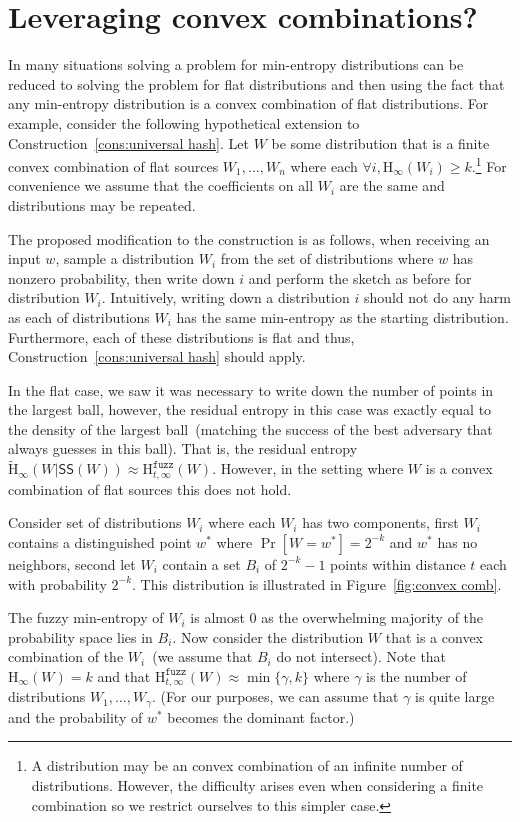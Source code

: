 \documentclass[11pt]{article}
\newcommand{\consref}[1]{\mbox{Construction~\ref{#1}}}
\newcommand{\figref}[1]{\mbox{Figure~\ref{#1}}}
\newcommand{\class}[1]{{\ensuremath{\mathsf{#1}}}}
\newcommand{\sketch}{\ensuremath{\class{SS}}\xspace}
\newcommand{\Hoo}{\mathrm{H}_\infty}
\newcommand{\Hav}{\tilde{\mathrm{H}}_\infty}
\newcommand{\Hfuzz}{\mathrm{H}^{\mathtt{fuzz}}_{t,\infty}}
\begin{document}
\section{Leveraging convex combinations?}
\label{sec:convex comb}
In many situations solving a problem for min-entropy distributions can be reduced to solving the problem for flat distributions and then using the fact that any min-entropy distribution is a convex combination of flat distributions.  For example, consider the following hypothetical extension to \consref{cons:universal hash}.  Let $W$ be some distribution that is a finite convex combination of flat sources $W_1,..., W_n$ where each $\forall i, \Hoo(W_i)\ge k$.\footnote{A distribution may be an  convex combination of an infinite number of distributions.  However, the difficulty arises even when considering a finite combination so we restrict ourselves to this simpler case.}  For convenience we assume that the coefficients on all $W_i$ are the same and distributions may be repeated. 

The proposed modification to the construction is as follows, when receiving an input $w$, sample a distribution $W_i$ from the set of distributions where $w$ has nonzero probability, then write down $i$ and perform the sketch as before for distribution $W_i$.  Intuitively, writing down a distribution $i$ should not do any harm as each of distributions $W_i$ has the same min-entropy as the starting distribution.  Furthermore, each of these distributions is flat and thus, \consref{cons:universal hash} should apply.

In the flat case, we saw it was necessary to write down the number of points in the largest ball, however, the residual entropy in this case was exactly equal to the density of the largest ball~(matching the success of the best adversary that always guesses in this ball).  That is, the residual entropy $\Hav(W|\sketch(W)) \approx \Hfuzz(W)$.  However, in the setting where $W$ is a convex combination of flat sources this does not hold.

Consider set of distributions $W_i$ where each $W_i$ has two components, first $W_i$ contains a distinguished point $w^*$ where $\Pr[W=w^*] = 2^{-k}$ and $w^*$ has no neighbors, second let $W_i$ contain a set $B_i$ of $2^{-k}-1$ points within distance $t$ each with probability $2^{-k}$.  This distribution is illustrated in \figref{fig:convex comb}.  

The fuzzy min-entropy of $W_i$ is almost $0$ as the overwhelming majority of the probability space lies in $B_i$.  Now consider the distribution $W$ that is a convex combination of the $W_i$~(we assume that $B_i$ do not intersect).  Note that $\Hoo(W)=k$ and that $\Hfuzz(W)\approx \min\{\gamma, k\}$ where $\gamma$ is the number of distributions $W_1,..., W_\gamma$.  (For our purposes, we can assume that $\gamma$ is quite large and the probability of $w^*$ becomes the dominant factor.)
\end{document}
